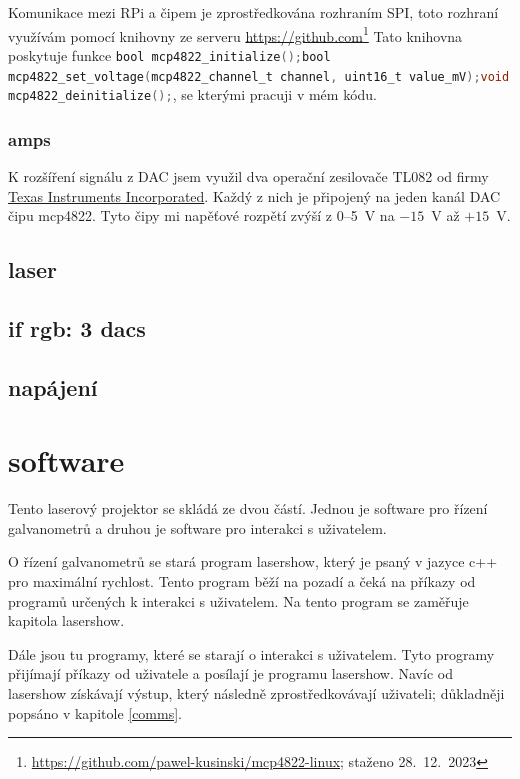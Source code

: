 \documentclass{template/socthesis}
\begin{document}
Komunikace mezi RPi a čipem je zprostředkována rozhraním SPI, toto rozhraní využívám pomocí knihovny ze serveru \url{https://github.com}\footnote{\url{https://github.com/pawel-kusinski/mcp4822-linux}; staženo 28.~12.~2023}  
Tato knihovna poskytuje funkce \lstinline[language=C]!bool mcp4822_initialize();bool mcp4822_set_voltage(mcp4822_channel_t channel, uint16_t value_mV);void mcp4822_deinitialize();!, se kterými pracuji v mém kódu.
\subsection{amps}
K rozšíření signálu z DAC jsem využil dva operační zesilovače TL082 od firmy \href{https://www.ti.com/}{Texas Instruments Incorporated}. Každý z nich je připojený na jeden kanál DAC čipu mcp4822.
Tyto čipy mi napěťové rozpětí zvýší z 0--5~V na $-15$~V až $+15$~V.

\section{laser}
\section{if rgb: 3 dacs}



\section{napájení}

\chapter{software} 
Tento laserový projektor se skládá ze dvou částí. Jednou je software pro řízení galvanometrů a druhou je software pro interakci s uživatelem.

O řízení galvanometrů se stará program lasershow, který je psaný v jazyce c++ pro maximální rychlost. Tento program běží na pozadí a čeká na příkazy od programů určených k interakci s uživatelem. Na tento program se zaměřuje kapitola lasershow. 

Dále jsou tu programy, které se starají o interakci s uživatelem. Tyto programy přijímají příkazy od uživatele a posílají je programu lasershow. Navíc od lasershow získávají výstup, který následně zprostředkovávají uživateli; důkladněji popsáno v kapitole \ref{comms}.
\end{document}
